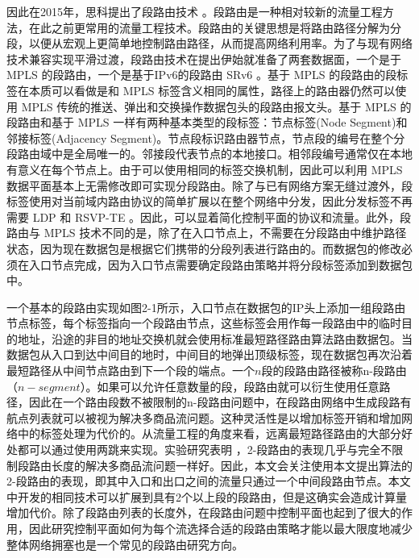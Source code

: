 因此在2015年，思科提出了段路由技术 \cite{SRARK}。段路由是一种相对较新的流量工程方法，在此之前更常用的流量工程技术。段路由的关键思想是将路由路径分解为分段，以便从宏观上更简单地控制路由路径，从而提高网络利用率。为了与现有网络技术兼容实现平滑过渡，段路由技术在提出伊始就准备了两套数据面，一个是于 \gls*{MPLS} 的段路由，一个是基于IPv6的段路由 \gls*{SRv6} 。基于 \gls*{MPLS} 的段路由的段标签在本质可以看做是和 \gls*{MPLS} 标签含义相同的属性，路径上的路由器仍然可以使用 \gls*{MPLS} 传统的推送、弹出和交换操作数据包头的段路由报文头。基于 \gls*{MPLS} 的段路由和基于 \gls*{MPLS} 一样有两种基本类型的段标签：节点标签(Node Segment)和邻接标签(Adjacency Segment)。节点段标识路由器节点，节点段的编号在整个分段路由域中是全局唯一的。邻接段代表节点的本地接口。相邻段编号通常仅在本地有意义在每个节点上。由于可以使用相同的标签交换机制，因此可以利用 \gls*{MPLS} 数据平面基本上无需修改即可实现分段路由。除了与已有网络方案无缝过渡外，段标签使用对当前域内路由协议的简单扩展以在整个网络中分发，因此分发标签不再需要 \gls*{LDP} 和 \gls*{RSVP-TE} 。因此，可以显着简化控制平面的协议和流量。此外，段路由与 \gls*{MPLS} 技术不同的是，除了在入口节点上，不需要在分段路由中维护路径状态，因为现在数据包是根据它们携带的分段列表进行路由的。而数据包的修改必须在入口节点完成，因为入口节点需要确定段路由策略并将分段标签添加到数据包中。

一个基本的段路由实现如图2-1所示，入口节点在数据包的IP头上添加一组段路由节点标签，每个标签指向一个段路由节点，这些标签会用作每一段路由中的临时目的地址，沿途的非目的地址交换机就会使用标准最短路径路由算法路由数据包。当数据包从入口到达中间目的地时，中间目的地弹出顶级标签，现在数据包再次沿着最短路径从中间节点路由到下一个段的端点。一个$n$段的段路由路径被称n-段路由（$n-segment$）。如果可以允许任意数量的段，段路由就可以衍生使用任意路径，因此在一个路由段数不被限制的n-段路由问题中，在段路由网络中生成段路有航点列表就可以被视为解决多商品流问题。这种灵活性是以增加标签开销和增加网络中的标签处理为代价的。从流量工程的角度来看，远离最短路径路由的大部分好处都可以通过使用两跳来实现。实验研究表明 \cite{SIDLENGTHANALYSIS} \cite{SIDLENGTHPROVE} ，2-段路由的表现几乎与完全不限制段路由长度的解决多商品流问题一样好。因此，本文会关注使用本文提出算法的2-段路由的表现，即其中入口和出口之间的流量只通过一个中间段路由节点。本文中开发的相同技术可以扩展到具有2个以上段的段路由，但是这确实会造成计算量增加代价。除了段路由列表的长度外，在段路由问题中控制平面也起到了很大的作用，因此研究控制平面如何为每个流选择合适的段路由策略才能以最大限度地减少整体网络拥塞也是一个常见的段路由研究方向。

